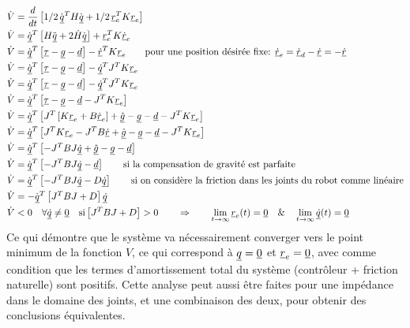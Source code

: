 \begin{align}
\dot{V} &= \frac{d}{dt} \left[ 1/2 \,  \dot{\col{q}}^T H \dot{\col{q}}  + 1/2 \, \col{r}_e^T K \col{r}_e \right]  \\
\dot{V} &= \dot{\col{q}}^T 
\left[ 
H \ddot{\col{q}} + 2 \dot{H} \dot{\col{q}}
\right] +
\col{r}_e^T K \col{\dot{r}}_e
\\%
\dot{V} &= \dot{\col{q}}^T 
\left[ 
\col{\tau} - \col{g} - \col{d}
\right] -
\col{\dot{r}}^T K \col{r}_e
\quad \quad
\text{pour une position désirée fixe: }  \col{\dot{r}}_e = \col{\dot{r}}_d - \col{\dot{r}} = - \col{\dot{r}}
\\%
\dot{V} &= \dot{\col{q}}^T 
\left[ 
\col{\tau} - \col{g} - \col{d}
\right] -
\col{\dot{q}}^T J^T K \col{r}_e
\\%
\dot{V} &= \dot{\col{q}}^T 
\left[ 
\col{\tau} - \col{g} - \col{d}
\right] -
\col{\dot{q}}^T J^T K \col{r}_e
\\%
\dot{V} &= \dot{\col{q}}^T 
\left[ 
\col{\tau} - \col{g} - \col{d}
- J^T K \col{r}_e
\right]
\\%
\dot{V} &= \dot{\col{q}}^T 
\left[ 
J^T   \left[ K \col{r}_e + B \col{\dot{r}}_e \right] + \col{\hat{g}}
- \col{g} - \col{d}
- J^T K \col{r}_e
\right]
\\%
\dot{V} &= \dot{\col{q}}^T 
\left[ 
J^T  K \col{r}_e 
- J^T B \col{\dot{r}}
+ \col{\hat{g}}
- \col{g} - \col{d}
- J^T K \col{r}_e
\right]
\\%
\dot{V} &= \dot{\col{q}}^T 
\left[ 
- J^T B J \col{\dot{q}}
+ \col{\hat{g}}
- \col{g} - \col{d}
\right]
\\%
\dot{V} &= \dot{\col{q}}^T 
\left[ 
- J^T B J \col{\dot{q}} - \col{d}
\right]
\quad \quad
\text{si la compensation de gravité est parfaite}
\\%
\dot{V} &= \dot{\col{q}}^T 
\left[ 
- J^T B J \col{\dot{q}} - D \col{\dot{q}}
\right]
\quad \quad
\text{si on considère la friction dans les joints du robot comme linéaire}
\\%
\dot{V} &= - \dot{\col{q}}^T 
\left[ 
J^T B J + D 
\right] \col{\dot{q}}
\\%
\dot{V} &< 0 \quad  
\forall \col{\dot{q}} \neq \col{0} \quad 
\text{si} \left[ J^T B J + D \right]  > 0
\quad\quad \Rightarrow \quad\quad
\lim_{t \rightarrow \infty} \col{r}_e(t) = \col{0} \quad \& \quad
\lim_{t \rightarrow \infty} \col{\dot{q}}(t) = \col{0}
\end{align} 
Ce qui démontre que le système va nécessairement converger vers le point minimum de la fonction $V$, ce qui correspond à $\underline{q} = \underline{0}$ et $\underline{r}_e = \underline{0}$, avec comme condition que les termes d'amortissement total du système (contrôleur + friction naturelle) sont positifs. Cette analyse peut aussi être faites pour une impédance dans le domaine des joints, et une combinaison des deux, pour obtenir des conclusions équivalentes. 

